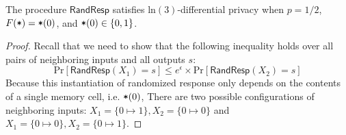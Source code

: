 \documentclass[11pt,twoside]{scrartcl}
\begin{document}
\begin{theorem}
\label{thm:randresp}
The procedure $\mathsf{RandResp}$ satisfies $\mathrm{ln}(3)$-differential privacy when $p = 1/2$, $F(\texttt{\upshape *}) = \texttt{\upshape *}(0)$, and $\texttt{\upshape *}(0) \in \{0,1\}$.
\end{theorem}
\begin{proof}
Recall that we need to show that the following inequality holds over all pairs of neighboring inputs and all outputs $s$:
\[
\mathrm{Pr}[\mathsf{RandResp}(X_1) = s] \le e^\epsilon \times \mathrm{Pr}[\mathsf{RandResp}(X_2) = s]
\]
Because this instantiation of randomized response only depends on the contents of a single memory cell, i.e. $\texttt{\upshape *}(0)$,
There are two possible configurations of neighboring inputs: $X_1 = \{0 \mapsto 1\}, X_2 = \{0 \mapsto 0\}$ and $X_1 = \{0 \mapsto 0\}, X_2 = \{0 \mapsto 1\}$. 


\end{proof}
\end{document}
